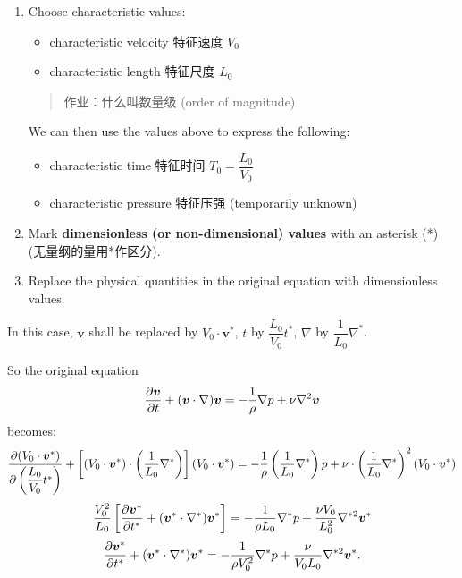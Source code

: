 \begin{enumerate}
\def\labelenumi{\arabic{enumi}.}
\item
  Choose characteristic values:

  \begin{itemize}
\tightlist{}
  \item
    characteristic velocity 特征速度 \(V_0\)
  \item
    characteristic length 特征尺度 \(L_0\)
  \end{itemize}

  \begin{quote}
  作业：什么叫数量级 (order of magnitude)
  \end{quote}

  We can then use the values above to express the following:

  \begin{itemize}
\tightlist{}
  \item
    characteristic time 特征时间 \(T_0 = \dfrac{L_0}{V_0}\)
  \item
    characteristic pressure 特征压强 (temporarily unknown)
  \end{itemize}
\item
  Mark \textbf{dimensionless (or non-dimensional) values} with an
  asterisk (*) (无量纲的量用*作区分).
\item
  Replace the physical quantities in the original equation with
  dimensionless values.
\end{enumerate}

In this case, \(\boldsymbol v\) shall be replaced by
\(V_0 \cdot \boldsymbol v^*\), \(t\) by \(\dfrac{L_0}{V_0} t^*\),
\(\nabla\) by \(\dfrac{1}{L_0} \nabla^*\).

So the original equation \[{\partial \boldsymbol v \over \partial t} + (\boldsymbol v \cdot \nabla) \boldsymbol v = - {1 \over \rho} \nabla p + \nu \nabla^2 \boldsymbol v\] becomes:
\[ {\partial (V_0 \cdot \boldsymbol v^*) \over \partial \left(\dfrac{L_0}{V_0} t^*\right)} + \left[ (V_0 \cdot \boldsymbol v^*) \cdot \left( \dfrac{1}{L_0} \nabla^* \right) \right] (V_0 \cdot \boldsymbol v^*) = -{1 \over \rho} \left( \dfrac{1}{L_0} \nabla^* \right) p + \nu \cdot \left( \dfrac{1}{L_0} \nabla^* \right)^2 (V_0 \cdot \boldsymbol v^*)\]
\[{V_0^2 \over L_0} \left[{\partial \boldsymbol v^* \over \partial t^*} + (\boldsymbol v^* \cdot \nabla^*) \boldsymbol v^*\right] = - {1 \over \rho L_0}\nabla^* p + {\nu V_0 \over L_0^2} \nabla^{*2} \boldsymbol v^*\]
\[{\partial \boldsymbol v^* \over \partial t^*} + (\boldsymbol v^* \cdot \nabla^*) \boldsymbol v^* = - {1 \over \rho V_0^2}\nabla^* p + {\nu \over V_0 L_0} \nabla^{*2} \boldsymbol v^*.\]

